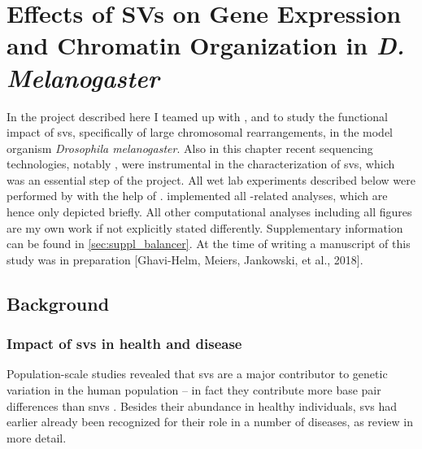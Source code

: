 \chapter{Effects of SVs on Gene Expression and Chromatin
Organization in \texorpdfstring{\textit{D. Melanogaster}}{D. Melanogaster}}
\label{sec:balancer}



In the project described here I teamed up with \yad, \alek and \eileen to study the functional
impact of \acp{sv}, specifically of large chromosomal rearrangements, in the model
organism \textit{Drosophila melanogaster}. Also in this chapter recent
sequencing technologies, notably \hic, were instrumental in the characterization
of \acp{sv}, which was an essential step of the project. All wet lab experiments
described below were performed by \yad with the help of \rebecca.
\alek implemented all \hic-related analyses, which are hence
only depicted briefly. All other computational analyses including all figures
are my own work if not explicitly stated differently. Supplementary information
can be found in \cref{sec:suppl_balancer}. At the time of writing a manuscript
of this study was in preparation [Ghavi-Helm, Meiers, Jankowski, et al., 2018].



\section{Background}
\label{sec:balancer_background}


\subsection{Impact of \texorpdfstring{\acsp{sv}}{SVs} in health and disease}

Population-scale studies revealed that \acp{sv} are a major contributor to
genetic variation in the human population \citep{Conrad2010} – in fact they
contribute more base pair differences than \acp{snv} \citep{Sudmant2015}.
Besides their abundance in healthy individuals, \acp{sv} had earlier already
been recognized for their role in a number of diseases, as
\citet{Zhang2009,Weischenfeldt2013,Carvalho2016} review in more detail.

